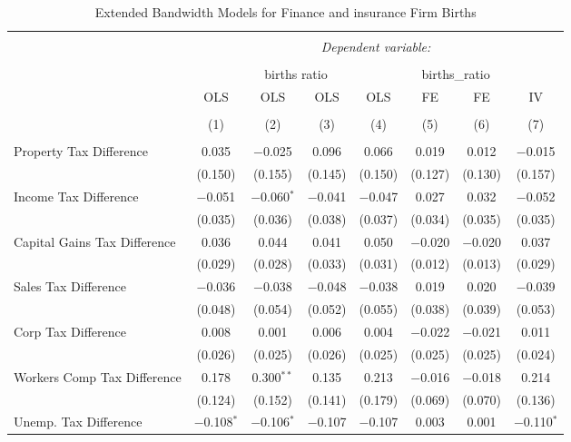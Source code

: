 
\begin{table}[!htbp] \centering 
  \caption{Extended Bandwidth Models for  Finance and insurance Firm Births} 
  \label{} 
\begin{tabular}{@{\extracolsep{5pt}}lccccccc} 
\\[-1.8ex]\hline 
\hline \\[-1.8ex] 
 & \multicolumn{7}{c}{\textit{Dependent variable:}} \\ 
\cline{2-8} 
\\[-1.8ex] & \multicolumn{4}{c}{births ratio} & \multicolumn{2}{c}{births\_ratio} &   \\ 
 & OLS & OLS & OLS & OLS & FE & FE & IV \\ 
\\[-1.8ex] & (1) & (2) & (3) & (4) & (5) & (6) & (7)\\ 
\hline \\[-1.8ex] 
 Property Tax Difference & 0.035 & $-$0.025 & 0.096 & 0.066 & 0.019 & 0.012 & $-$0.015 \\ 
  & (0.150) & (0.155) & (0.145) & (0.150) & (0.127) & (0.130) & (0.157) \\ 
  Income Tax Difference & $-$0.051 & $-$0.060$^{*}$ & $-$0.041 & $-$0.047 & 0.027 & 0.032 & $-$0.052 \\ 
  & (0.035) & (0.036) & (0.038) & (0.037) & (0.034) & (0.035) & (0.035) \\ 
  Capital Gains Tax Difference & 0.036 & 0.044 & 0.041 & 0.050 & $-$0.020 & $-$0.020 & 0.037 \\ 
  & (0.029) & (0.028) & (0.033) & (0.031) & (0.012) & (0.013) & (0.029) \\ 
  Sales Tax Difference & $-$0.036 & $-$0.038 & $-$0.048 & $-$0.038 & 0.019 & 0.020 & $-$0.039 \\ 
  & (0.048) & (0.054) & (0.052) & (0.055) & (0.038) & (0.039) & (0.053) \\ 
  Corp Tax Difference & 0.008 & 0.001 & 0.006 & 0.004 & $-$0.022 & $-$0.021 & 0.011 \\ 
  & (0.026) & (0.025) & (0.026) & (0.025) & (0.025) & (0.025) & (0.024) \\ 
  Workers Comp Tax Difference & 0.178 & 0.300$^{**}$ & 0.135 & 0.213 & $-$0.016 & $-$0.018 & 0.214 \\ 
  & (0.124) & (0.152) & (0.141) & (0.179) & (0.069) & (0.070) & (0.136) \\ 
  Unemp. Tax Difference & $-$0.108$^{*}$ & $-$0.106$^{*}$ & $-$0.107 & $-$0.107 & 0.003 & 0.001 & $-$0.110$^{*}$ \\ 

\end{tabular}
\end{table}
